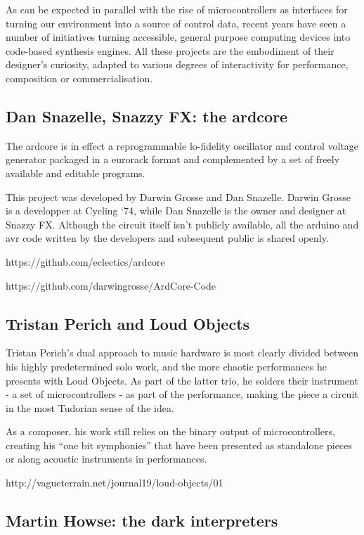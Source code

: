As can be expected in parallel with the rise of microcontrollers as interfaces for turning our environment into a source of control data, recent years have seen a number of initiatives turning accessible, general purpose computing devices into code-based synthesis engines. All these projects are the embodiment of their designer's curiosity, adapted to various degrees of interactivity for performance, composition or commercialisation. 

\subsection{Dan Snazelle, Snazzy FX: the ardcore}

The ardcore is in effect a reprogrammable lo-fidelity oscillator and control voltage generator packaged in a eurorack format and complemented by a set of freely available and editable programs. 

This project was developed by Darwin Grosse and Dan Snazelle. Darwin Grosse is a developper at Cycling `74, while Dan Snazelle is the owner and designer at Snazzy FX. Although the circuit itself isn't publicly available, all the arduino and avr code written by the developers and subsequent public is shared openly. 

https://github.com/eclectics/ardcore

https://github.com/darwingrosse/ArdCore-Code



\subsection{Tristan Perich and Loud Objects}

Tristan Perich's dual approach to music hardware is most clearly divided between his highly predetermined solo work, and the more chaotic performances he presents with Loud Objects. As part of the latter trio, he solders their instrument - a set of microcontrollers - as part of the performance, making the piece a circuit in the most Tudorian sense of the idea. 

As a composer, his work still relies on the binary output of microcontrollers, creating his ``one bit symphonies'' that have been presented as standalone pieces or along acoustic instruments in performances. 

http://vagueterrain.net/journal19/loud-objects/01

\subsection{Martin Howse: the dark interpreters}

